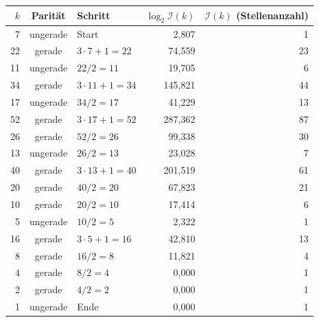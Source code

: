 \documentclass[12pt,a4paper]{article}
\newcommand{\In}{\mathcal{I}}      %
\begin{document}
\begin{center}
\renewcommand{\arraystretch}{1.35}
\begin{tabular}{rclrr}
\toprule
$k$ & Parität & Schritt & $\log_2 \In(k)$ & $\In(k)$ (Stellenanzahl) \\
\midrule
 7 & ungerade & Start               &  2{,}807  &  1 \\
22 & gerade   & $3\cdot 7+1 = 22$  & 74{,}559  & 23 \\
11 & ungerade & $22/2 = 11$        & 19{,}705  &  6 \\
34 & gerade   & $3\cdot 11+1 = 34$ & 145{,}821 & 44 \\
17 & ungerade & $34/2 = 17$        & 41{,}229  & 13 \\
52 & gerade   & $3\cdot 17+1 = 52$ & 287{,}362 & 87 \\
26 & gerade   & $52/2 = 26$        &  99{,}338 & 30 \\
13 & ungerade & $26/2 = 13$        &  23{,}028 &  7 \\
40 & gerade   & $3\cdot 13+1 = 40$ & 201{,}519 & 61 \\
20 & gerade   & $40/2 = 20$        &  67{,}823 & 21 \\
10 & gerade   & $20/2 = 10$        &  17{,}414 &  6 \\
 5 & ungerade & $10/2 = 5$         &   2{,}322 &  1 \\
16 & gerade   & $3\cdot 5+1 = 16$  &  42{,}810 & 13 \\
 8 & gerade   & $16/2 = 8$         &  11{,}821 &  4 \\
 4 & gerade   & $8/2 = 4$          &   0{,}000 &  1 \\
 2 & gerade   & $4/2 = 2$          &   0{,}000 &  1 \\
 1 & ungerade & Ende               &   0{,}000 &  1 \\
\bottomrule
\end{tabular}
\end{center}
\end{document}
